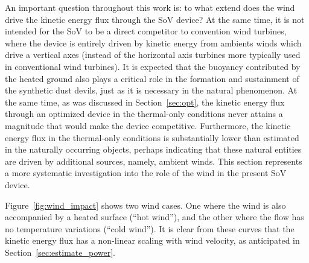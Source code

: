 
An important question throughout this work is: to what extend does the wind
drive the kinetic energy flux through the SoV device? At the same time, 
it is not intended for the SoV to be a direct competitor to convention wind turbines,
where the device is entirely driven by kinetic energy from ambients winds which drive 
a vertical axes (instead of the horizontal axis turbines more typically 
used in conventional wind turbines). It is expected that the buoyancy contributed
by the heated ground also plays a critical role in the formation and sustainment of 
the synthetic dust devils, just as it is necessary in the natural phenomenon. 
At the same time, as was discussed in Section~\ref{sec:opt}, 
the kinetic energy flux through an optimized device in the thermal-only conditions
never attains a magnitude that would make the device competitive. 
Furthermore, the kinetic energy flux in the thermal-only conditions 
is substantially lower than estimated in the naturally occurring objects, 
perhaps indicating that these natural entities are driven by additional sources, 
namely, ambient winds.
This section represents a more systematic investigation into the role of the wind 
in the present SoV device. 

Figure~\ref{fig:wind_impact} shows two wind cases. One where the wind is
also accompanied by a heated surface (``hot wind''), and the other where
the flow has no temperature variations (``cold wind''). It is clear from
these curves that the kinetic energy flux has a non-linear scaling with
wind velocity, as anticipated in Section~\ref{sec:estimate_power}. 

